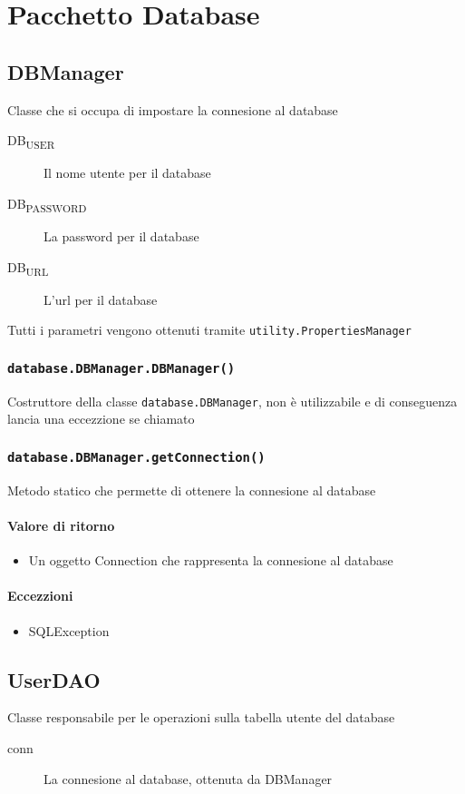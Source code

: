 \section{Pacchetto Database}
\label{sec:package_database}

\subsection{DBManager}
Classe che si occupa di impostare la connesione al database
\begin{description}
\item[DB\textsubscript{USER}]  Il nome utente per il database
\item[DB\textsubscript{PASSWORD}] La password per il database
\item[DB\textsubscript{URL}]  L'url per il database
\end{description}
Tutti i parametri vengono ottenuti tramite \texttt{utility.PropertiesManager}
\subsubsection{\texttt{database.DBManager.DBManager()}}
Costruttore della classe \texttt{database.DBManager}, non è utilizzabile e di conseguenza
lancia una eccezzione se chiamato

\subsubsection{\texttt{database.DBManager.getConnection()}}
Metodo statico che permette di ottenere la connesione al database
\paragraph{Valore di ritorno}
\begin{itemize}
\item Un oggetto Connection che rappresenta la connesione al database
\end{itemize}
\paragraph{Eccezzioni}
\begin{itemize}
  \item SQLException
\end{itemize}


\subsection{UserDAO}
Classe responsabile per le operazioni sulla
tabella utente del database
\begin{description}
\item[conn] La connesione al database, ottenuta da DBManager
\end{description}

